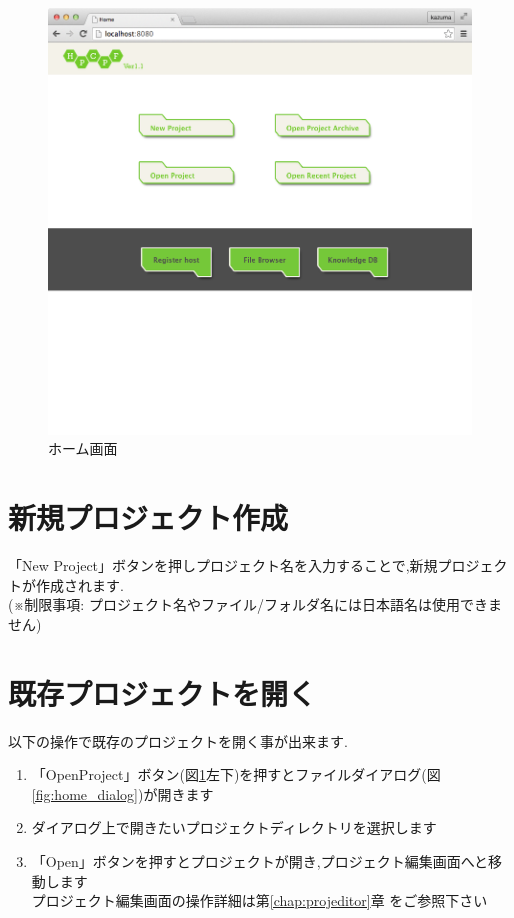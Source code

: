 \documentclass[a4paper,10pt,oneside]{jsbook}
\begin{document}
\begin{figure}[htbp]
	\begin{center}
		\includegraphics[width=11.5cm]{image/home_000.png}
	\end{center}
	\caption{ホーム画面}
	\label{fig:home}
\end{figure}


\section{新規プロジェクト作成}
「New Project」ボタンを押しプロジェクト名を入力することで,新規プロジェクトが作成されます.\\
(※制限事項: プロジェクト名やファイル/フォルダ名には日本語名は使用できません)

\section{既存プロジェクトを開く}
以下の操作で既存のプロジェクトを開く事が出来ます.
\begin{enumerate}
	\item 「OpenProject」ボタン(図\ref{fig:home}左下)を押すとファイルダイアログ(図\ref{fig:home_dialog})が開きます
	\item ダイアログ上で開きたいプロジェクトディレクトリを選択します
	\item 「Open」ボタンを押すとプロジェクトが開き,プロジェクト編集画面へと移動します\\
			プロジェクト編集画面の操作詳細は第\ref{chap:projeditor}章 をご参照下さい
\end{enumerate}
\end{document}
